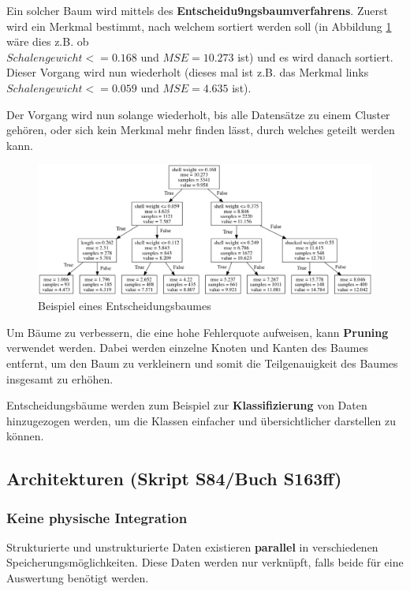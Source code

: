 \documentclass[a4paper, 11pt, nofootinbib]{article}
\begin{document}
\vspace{10px}

\noindent Ein solcher Baum wird mittels des \textbf{Entscheidu9ngsbaumverfahrens}. Zuerst wird ein Merkmal bestimmt, nach welchem sortiert werden soll (in Abbildung \ref{fig:tree} wäre dies z.B. ob \\ 
$Schalengewicht <= 0.168$ und  $MSE = 10.273$ ist) und es wird danach sortiert. Dieser Vorgang wird nun wiederholt (dieses mal ist z.B. das Merkmal links $Schalengewicht <=0.059$ und $MSE = 4.635$ ist).

Der Vorgang wird nun solange wiederholt, bis alle Datensätze zu einem Cluster gehören, oder sich kein Merkmal mehr finden lässt, durch welches geteilt werden kann.

\begin{figure}[htb]
	\centering
	\includegraphics[keepaspectratio=true,height=13\baselineskip]{tree.png}
	\caption{Beispiel eines Entscheidungsbaumes}
	\label{fig:tree}
\end{figure}

Um Bäume zu verbessern, die eine hohe Fehlerquote aufweisen, kann \textbf{Pruning} verwendet werden. Dabei werden einzelne Knoten und Kanten des Baumes entfernt, um den Baum zu verkleinern und somit die Teilgenauigkeit des Baumes insgesamt zu erhöhen.

\vspace{10px}

\noindent Entscheidungsbäume werden zum Beispiel zur \textbf{Klassifizierung} von Daten hinzugezogen werden, um die Klassen einfacher und übersichtlicher darstellen zu können.

\newpage

\subsection{Architekturen (Skript S84/Buch S163ff)}
\subsubsection{Keine physische Integration}
Strukturierte und unstrukturierte Daten existieren \textbf{parallel} in verschiedenen Speicherungsmöglichkeiten. Diese Daten werden nur verknüpft, falls beide für eine Auswertung benötigt werden.
\end{document}
